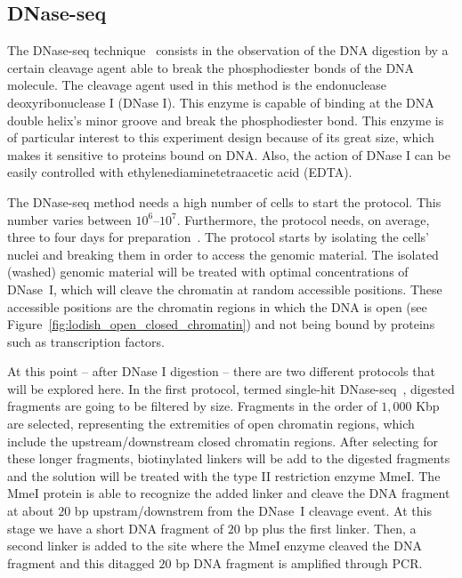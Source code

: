 \subsection{DNase-seq}
\label{sec:dnase.seq}

The DNase-seq technique~\cite{crawford2004,sabo2004a} consists in the observation of the DNA digestion by a certain cleavage agent able to break the phosphodiester bonds of the DNA molecule. The cleavage agent used in this method is the endonuclease deoxyribonuclease I (DNase I). This enzyme is capable of binding at the DNA double helix's minor groove and break the phosphodiester bond. This enzyme is of particular interest to this experiment design because of its great size, which makes it sensitive to proteins bound on DNA. Also, the action of DNase I can be easily controlled with ethylenediaminetetraacetic acid (EDTA).

The DNase-seq method needs a high number of cells to start the protocol. This number varies between $10^{6}$--$10^{7}$. Furthermore, the protocol needs, on average, three to four days for preparation~\cite{buenrostro2013}. The protocol starts by isolating the cells' nuclei and breaking them in order to access the genomic material. The isolated (washed) genomic material will be treated with optimal concentrations of DNase~I, which will cleave the chromatin at random accessible positions. These accessible positions are the chromatin regions in which the DNA is open (see Figure~\ref{fig:lodish_open_closed_chromatin}) and not being bound by proteins such as transcription factors.

At this point -- after DNase I digestion -- there are two different protocols that will be explored here. In the first protocol, termed single-hit DNase-seq~\cite{crawford2004}, digested fragments are going to be filtered by size. Fragments in the order of $1,000$ Kbp are selected, representing the extremities of open chromatin regions, which include the upstream/downstream closed chromatin regions. After selecting for these longer fragments, biotinylated linkers will be add to the digested fragments and the solution will be treated with the type II restriction enzyme MmeI. The MmeI protein is able to recognize the added linker and cleave the DNA fragment at about $20$ bp upstram/downstrem from the DNase~I cleavage event. At this stage we have a short DNA fragment of $20$ bp plus the first linker. Then, a second linker is added to the site where the MmeI enzyme cleaved the DNA fragment and this ditagged $20$ bp DNA fragment is amplified through PCR.

